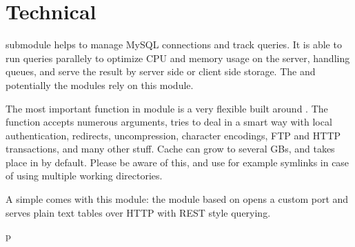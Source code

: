\documentclass[letterpaper,10pt,english]{sphinxmanual}
\begin{document}
\section{Technical}
\label{\detokenize{index:technical}}
 submodule helps to manage MySQL connections and track queries. It is
able to run queries parallely to optimize CPU and memory usage on the server,
handling queues, and serve the result by server side or client side storage.
The  and potentially the  modules rely on this 
module.

The most important function in module  is a very flexible  built around . The function  accepts
numerous arguments, tries to deal in a smart way with local 
authentication, redirects, uncompression, character encodings, FTP and HTTP
transactions, and many other stuff. Cache can grow to several GBs, and takes
place in  by default. Please be aware of this, and use for example
symlinks in case of using multiple working directories.

A simple  comes with this module: the  module based on
 opens a custom port and serves plain text tables over
HTTP with REST style querying.


\renewcommand{\indexname}{Python Module Index}
\begin{sphinxtheindex}
\def\bigletter#1{{\Large\sffamily#1}\nopagebreak\vspace{1mm}}
\bigletter{p}
\item {}
\end{sphinxtheindex}

\renewcommand{\indexname}{Index}
\printindex
\end{document}
